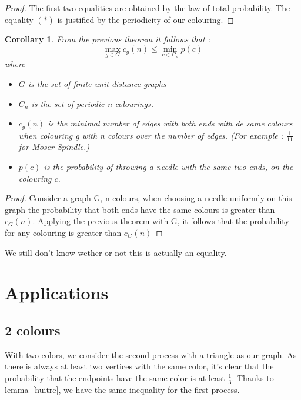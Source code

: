 \documentclass[a4paper,11pt]{article}
\newtheorem{cons}{Corollary}
\theoremstyle{definition}
\theoremstyle{remark}
\begin{document}
\begin{proof}
The first two equalities are obtained by the law of total probability.
The equality $(*)$ is justified by the periodicity of our colouring.
\end{proof}

\begin{cons} \label{ineg}
From the previous theorem it follows that :
$$ \max_{g \in G} c_g(n) \leq \min_{c \in C_n} p(c) $$
where \begin{itemize} 
  \item $G$ is the set of finite unit-distance graphs 
  \item $C_n$ is the set of periodic n-colourings.
  \item $c_g(n)$ is the minimal number of edges with both ends with de
same colours when colouring g with n colours over the number of edges.
(For example : $\frac 1 {11}$ for Moser Spindle.)
  \item $p(c)$ is the probability of throwing a needle with the same two
ends, on the colouring $c$.
\end{itemize}

\end{cons}

\begin{proof}
Consider a graph G, n colours, when choosing a needle
uniformly on this graph the probability that both ends have the same
colours is greater than $c_G(n)$. Applying the previous theorem with G, 
it follows that the probability for any colouring is greater than $c_G(n)$    
\end{proof}
We still don't know wether or not this is actually an equality. 

\section{Applications} \label{appli}
\subsection{2 colours}


With two colors, we consider the second process with a triangle as our graph. 
As there is always at least two vertices with the same color, it's clear that 
the probability that the endpoints have the same color is at least 
$\frac{1}{3}$. Thanks to lemma~\ref{huitre}, we have the same inequality for 
the first process.
\end{document}
